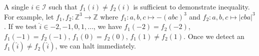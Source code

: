 \documentclass[11pt]{article}
\begin{document}

    \noindent A single $i \in \mathcal{I}$ such that $f_1(i) \neq f_2(i)$ is sufficient to demonstrate inequality. For example, let $f_1, f_2: \mathbb{Z}^3 \rightarrow \mathbb{Z}$ where $f_1: {a, b, c}\mapsto -(abc)^3$ and $f_2: {a, b, c} \mapsto |cba|^3$. If we test $\hat i \in {-2, -1, 0, 1, \ldots}$, we have $f_1(-2)=f_2(-2)$, $f_1(-1)=f_2(-1)$, $f_1(0)=f_2(0)$, $f_1(1) \neq f_2(1)$. Once we detect an $f_1(\hat i) \neq f_2(\hat i)$, we can halt immediately.

\end{document}
